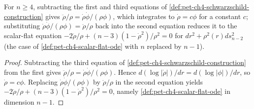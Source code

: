 \begin{proposition}
  \label{prop:pet-ch4-schwarzschild-reduces-scalar-flat}
  \leanok
  For $n\ge4$, subtracting the first and third equations of
  \cref{def:pet-ch4-schwarzschild-construction} gives
  $\ddot\rho/\rho=\dot\rho\dot\phi/(\rho\phi)$, which integrates to
  $\dot\rho=c\phi$ for a constant $c$; substituting
  $\dot\rho\dot\phi/(\rho\phi)=\ddot\rho/\rho$ back into the second equation
  reduces it to the scalar-flat equation
  $-2\ddot\rho/\rho+(n-3)(1-\dot\rho^2)/\rho^2=0$ for $dr^2+\rho^2(r)ds_{n-2}^2$
  (the case of \cref{def:pet-ch4-scalar-flat-ode} with $n$ replaced by $n-1$).
\end{proposition}
\begin{proof}
  \leanok
  \sketch
  Subtracting the third equation of
  \cref{def:pet-ch4-schwarzschild-construction} from the first gives
  $\ddot\rho/\rho=\dot\rho\dot\phi/(\rho\phi)$. Hence
  $d(\log|\dot\rho|)/dr=d(\log|\phi|)/dr$, so $\dot\rho=c\phi$. Replacing
  $\dot\rho\dot\phi/(\rho\phi)$ by $\ddot\rho/\rho$ in the second equation
  yields
  $-2\ddot\rho/\rho+(n-3)(1-\dot\rho^2)/\rho^2=0$, namely
  \cref{def:pet-ch4-scalar-flat-ode} in dimension $n-1$.
\end{proof}


